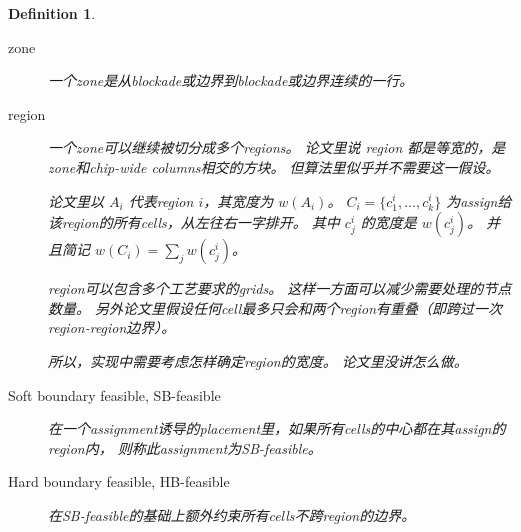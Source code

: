 \documentclass[UTF8,a4paper]{ctexart}
\newtheorem{definition}{Definition}
\begin{document}
\begin{definition}
    \;
    \begin{description}
    \item[zone] 
        一个zone是从blockade或边界到blockade或边界连续的一行。
    \item[region]
        一个zone可以继续被切分成多个regions。
        论文里说 region 都是等宽的，是zone和chip-wide columns相交的方块。
        但算法里似乎并不需要这一假设。
    
        论文里以 $A_i$ 代表region $i$，其宽度为 $w(A_i)$。
        $C_i=\{c^i_1,\dots,c^i_k\}$ 为assign给该region的所有cells，从左往右一字排开。
        其中 $c^i_j$ 的宽度是 $w(c^i_j)$。
        并且简记 $w(C_i)=\sum_j w(c^i_j)$。
    
        \begin{noteblock}
            region可以包含多个工艺要求的grids。
            这样一方面可以减少需要处理的节点数量。
            另外论文里假设任何cell最多只会和两个region有重叠（即跨过一次region-region边界）。
            
            所以，实现中需要考虑怎样确定region的宽度。
            论文里没讲怎么做。
        \end{noteblock}
    \item[Soft boundary feasible, SB-feasible]
        在一个assignment诱导的placement里，如果所有cells的中心都在其assign的region内，
        则称此assignment为SB-feasible。
    \item[Hard boundary feasible, HB-feasible]
        在SB-feasible的基础上额外约束所有cells不跨region的边界。
    

\end{description}
\end{definition}
\end{document}
